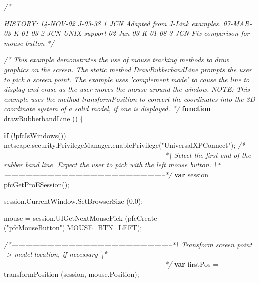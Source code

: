 \documentclass[]{article}
\newenvironment{Shaded}{}{}
\newcommand{\KeywordTok}[1]{\textcolor[rgb]{0.00,0.44,0.13}{\textbf{{#1}}}}
\newcommand{\FloatTok}[1]{\textcolor[rgb]{0.25,0.63,0.44}{{#1}}}
\newcommand{\StringTok}[1]{\textcolor[rgb]{0.25,0.44,0.63}{{#1}}}
\newcommand{\CommentTok}[1]{\textcolor[rgb]{0.38,0.63,0.69}{\textit{{#1}}}}
\newcommand{\OtherTok}[1]{\textcolor[rgb]{0.00,0.44,0.13}{{#1}}}
\newcommand{\FunctionTok}[1]{\textcolor[rgb]{0.02,0.16,0.49}{{#1}}}
\newcommand{\NormalTok}[1]{{#1}}
\begin{document}
\begin{Shaded}
\begin{Highlighting}[]
\CommentTok{/*}

\CommentTok{  HISTORY:}
\CommentTok{ }
\CommentTok{ 14-NOV-02   J-03-38   $$1   JCN      Adapted from J-Link examples.}
\CommentTok{ 07-MAR-03   K-01-03   $$2   JCN      UNIX support}
\CommentTok{ 02-Jun-03   K-01-08   $$3   JCN      Fix comparison for mouse button}
\CommentTok{*/}

\CommentTok{/* }
\CommentTok{   This example demonstrates the use of mouse tracking methods to draw graphics}
\CommentTok{   on the screen.  The static method DrawRubberbandLine prompts the user to}
\CommentTok{   pick a screen point.  The example uses 'complement mode' to cause the line }
\CommentTok{   to display and erase as the user moves the mouse around the window.  }
\CommentTok{   }
\CommentTok{   NOTE:  This example uses the method transformPosition to convert the }
\CommentTok{   coordinates into the 3D coordinate system of a solid model, if one is }
\CommentTok{   displayed.}
\CommentTok{*/}
\KeywordTok{function} \FunctionTok{drawRubberbandLine} \NormalTok{() }
\NormalTok{\{}
  
  \KeywordTok{if} \NormalTok{(!}\FunctionTok{pfcIsWindows}\NormalTok{())}
    \OtherTok{netscape}\NormalTok{.}\OtherTok{security}\NormalTok{.}\OtherTok{PrivilegeManager}\NormalTok{.}\FunctionTok{enablePrivilege}\NormalTok{(}\StringTok{"UniversalXPConnect"}\NormalTok{);   }
\CommentTok{/*--------------------------------------------------------------------*\textbackslash{} }
\CommentTok{  Select the first end of the rubber band line.  Expect the user to pick with }
\CommentTok{  the left mouse button.}
\CommentTok{\textbackslash{}*--------------------------------------------------------------------*/}      
  \KeywordTok{var} \NormalTok{session = }\FunctionTok{pfcGetProESession}\NormalTok{();}
  
  \OtherTok{session}\NormalTok{.}\OtherTok{CurrentWindow}\NormalTok{.}\FunctionTok{SetBrowserSize} \NormalTok{(}\FloatTok{0.0}\NormalTok{);}
  
  \NormalTok{mouse = }\OtherTok{session}\NormalTok{.}\FunctionTok{UIGetNextMousePick} \NormalTok{(}\FunctionTok{pfcCreate} \NormalTok{(}\StringTok{"pfcMouseButton"}\NormalTok{).}\FunctionTok{MOUSE_BTN_LEFT}\NormalTok{);}
  
\CommentTok{/*--------------------------------------------------------------------*\textbackslash{} }
\CommentTok{  Transform screen point -> model location, if necessary}
\CommentTok{\textbackslash{}*--------------------------------------------------------------------*/}  
  \KeywordTok{var} \NormalTok{firstPos = }\FunctionTok{transformPosition} \NormalTok{(session, }\OtherTok{mouse}\NormalTok{.}\FunctionTok{Position}\NormalTok{);}
  

\end{Highlighting}
\end{Shaded}
\end{document}

